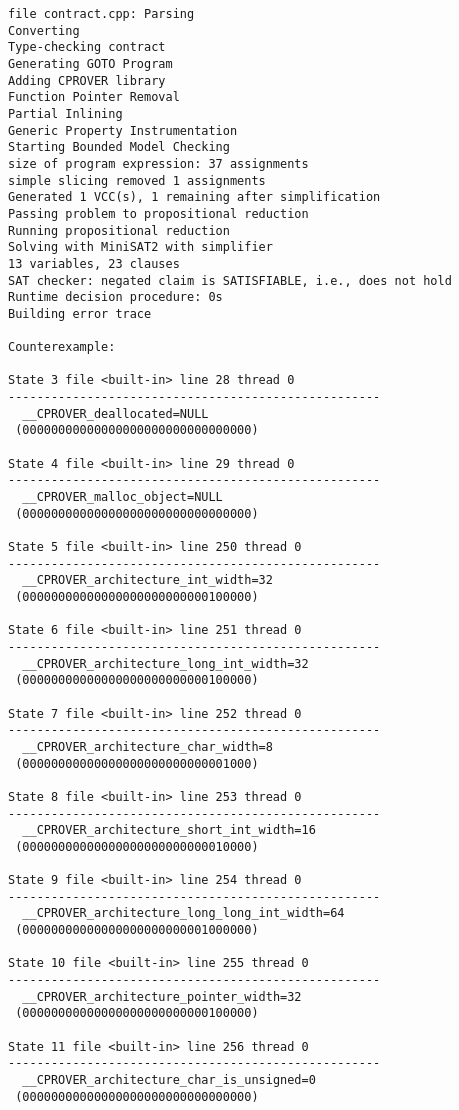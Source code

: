 \begin{lstlisting}
file contract.cpp: Parsing
Converting
Type-checking contract
Generating GOTO Program
Adding CPROVER library
Function Pointer Removal
Partial Inlining
Generic Property Instrumentation
Starting Bounded Model Checking
size of program expression: 37 assignments
simple slicing removed 1 assignments
Generated 1 VCC(s), 1 remaining after simplification
Passing problem to propositional reduction
Running propositional reduction
Solving with MiniSAT2 with simplifier
13 variables, 23 clauses
SAT checker: negated claim is SATISFIABLE, i.e., does not hold
Runtime decision procedure: 0s
Building error trace

Counterexample:

State 3 file <built-in> line 28 thread 0
----------------------------------------------------
  __CPROVER_deallocated=NULL
 (00000000000000000000000000000000)

State 4 file <built-in> line 29 thread 0
----------------------------------------------------
  __CPROVER_malloc_object=NULL
 (00000000000000000000000000000000)

State 5 file <built-in> line 250 thread 0
----------------------------------------------------
  __CPROVER_architecture_int_width=32
 (00000000000000000000000000100000)

State 6 file <built-in> line 251 thread 0
----------------------------------------------------
  __CPROVER_architecture_long_int_width=32
 (00000000000000000000000000100000)

State 7 file <built-in> line 252 thread 0
----------------------------------------------------
  __CPROVER_architecture_char_width=8
 (00000000000000000000000000001000)

State 8 file <built-in> line 253 thread 0
----------------------------------------------------
  __CPROVER_architecture_short_int_width=16
 (00000000000000000000000000010000)

State 9 file <built-in> line 254 thread 0
----------------------------------------------------
  __CPROVER_architecture_long_long_int_width=64
 (00000000000000000000000001000000)

State 10 file <built-in> line 255 thread 0
----------------------------------------------------
  __CPROVER_architecture_pointer_width=32
 (00000000000000000000000000100000)

State 11 file <built-in> line 256 thread 0
----------------------------------------------------
  __CPROVER_architecture_char_is_unsigned=0
 (00000000000000000000000000000000)


\end{lstlisting}
